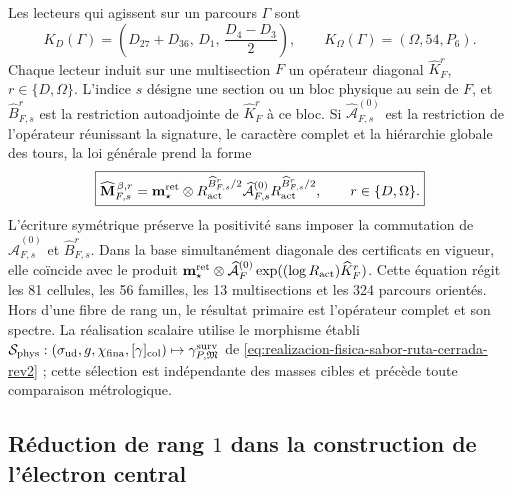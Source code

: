 Les lecteurs qui agissent sur un parcours \(\Gamma\) sont
\begin{equation}
 K_D(\Gamma)
 =\left(D_{27}+D_{36},\,D_1,\,\frac{D_4-D_3}{2}\right),
 \qquad
 K_\Omega(\Gamma)=(\Omega,54,P_6).
 \label{eq:lectores-kd-komega-masas-rectoras}
\end{equation}
Chaque lecteur induit sur une multisection \(F\) un opérateur diagonal
\(\widehat K_F^r\), \(r\in\{D,\Omega\}\). L'indice \(s\) désigne une section ou un
bloc physique au sein de \(F\), et \(\widehat B_{F,s}^r\) est la restriction
autoadjointe de \(\widehat K_F^r\) à ce bloc. Si
\(\widehat{\mathcal A}^{(0)}_{F,s}\) est la restriction de l'opérateur réunissant la
signature, le caractère complet et la hiérarchie globale des tours, la loi générale prend
la forme
\begin{equation}
 \boxed{
 \widehat{\mathbf M}^{\,\beta,r}_{F,s}
 =\mathbf m_\star^{\rm ret}\otimes
  R_{\rm act}^{\widehat B_{F,s}^r/2}
  \widehat{\mathcal A}^{(0)}_{F,s}
  R_{\rm act}^{\widehat B_{F,s}^r/2},
 \qquad r\in\{D,\Omega\}.}
 \label{eq:ley-operatorial-general-masas-rectoras}
\end{equation}
L'écriture symétrique préserve la positivité sans imposer la commutation de
\(\widehat{\mathcal A}^{(0)}_{F,s}\) et \(\widehat B_{F,s}^r\). Dans la base
simultanément diagonale des certificats en vigueur, elle coïncide avec le produit
\(\mathbf m_\star^{\rm ret}\otimes\widehat{\mathcal A}^{(0)}_F
\exp((\log R_{\rm act})\widehat K_F^r)\).
Cette équation régit les 81 cellules, les 56 familles, les 13 multisections et les
324 parcours orientés. Hors d'une fibre de rang un, le résultat primaire est
l'opérateur complet et son spectre. La réalisation scalaire utilise le morphisme établi
\(\mathcal S_{\rm phys}:(\sigma_{\rm ud},g,\chi_{\rm fina},[\gamma]_{\rm col})
\mapsto\gamma^{\rm surv}_{P,\mathfrak M}\) de
\cref{eq:realizacion-fisica-sabor-ruta-cerrada-rev2} ; cette sélection est
indépendante des masses cibles et précède toute comparaison métrologique.

\subsection{Réduction de rang \(1\) dans la construction de l'électron central}

